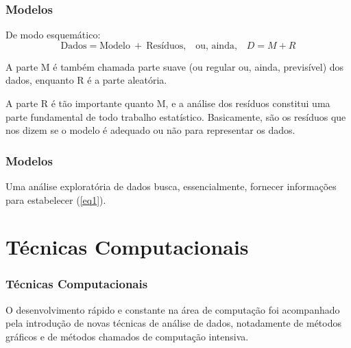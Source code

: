 \documentclass[12pt]{beamer}
\begin{document}
\begin{frame}{}
\frametitle{Modelos}
\begin{block}{}
\justifying
De modo esquemático:
\begin{equation}
\label{eq1}
\textrm{Dados}=\textrm{Modelo}\ +\ \textrm{Resíduos,}\quad \textrm{ou, ainda,}\quad 
D=M+R
\end{equation}
\end{block}
\pause
\begin{block}{}
\justifying
A parte M é também chamada parte suave (ou regular ou, ainda, previsível) dos dados, enquanto R é a parte aleatória. 
\end{block}
\pause
\begin{block}{}
\justifying
A parte R é tão importante quanto M, e a análise dos resíduos constitui uma parte fundamental de todo trabalho estatístico. Basicamente, são os resíduos que nos 
dizem se o modelo é adequado ou não para representar os dados.
\end{block}
\end{frame}

\begin{frame}{}
\frametitle{Modelos}
\begin{block}{}
\justifying
Uma análise exploratória de dados busca, essencialmente, fornecer informações
para estabelecer (\ref{eq1}).
\end{block}
\end{frame}

\section{Técnicas Computacionais}
\begin{frame}{}
\frametitle{Técnicas Computacionais}
\begin{block}{}
\justifying
O desenvolvimento rápido e constante na área de computação foi acompanhado pela introdução de novas técnicas de análise de dados, notadamente de métodos 
gráficos e de métodos chamados de computação intensiva.
\end{block}
\end{frame}
\end{document}
